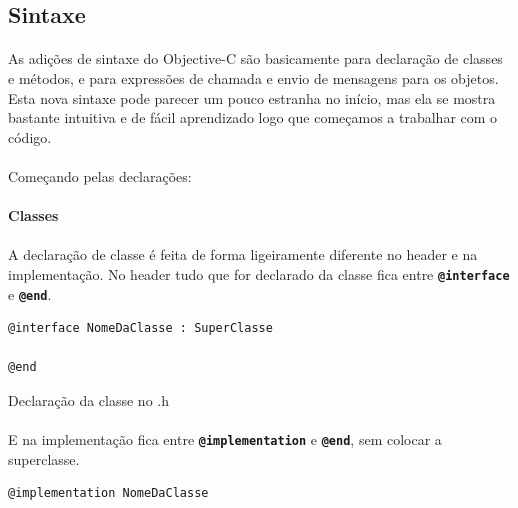 \documentclass[a4paper,12pt,brazil,doubleside]{book}
\begin{document}
\begin{singlespace}
\bigskip 

\subsection{Sintaxe}

\paragraph{}As adições de sintaxe do Objective-C são basicamente para declaração de classes e métodos, e para expressões de chamada e envio de mensagens para os objetos. Esta nova sintaxe pode parecer um pouco estranha no início, mas ela se mostra bastante intuitiva e de fácil aprendizado logo que começamos a trabalhar com o código.
\paragraph{}Começando pelas declarações:

\bigskip 

\paragraph{}\textbf{Classes}

\paragraph{}A declaração de classe é feita de forma ligeiramente diferente no header e na implementação. No header tudo que for declarado da classe fica entre \texttt{\textbf{@interface}} e \texttt{\textbf{@end}}.

\begin{listing}
\begin{verbatim}
@interface NomeDaClasse : SuperClasse

@end
\end{verbatim}
\caption{Declaração da classe no .h}
\end{listing}

\paragraph{}E na implementação fica entre \texttt{\textbf{@implementation}} e \texttt{\textbf{@end}}, sem colocar a superclasse.

\begin{listing}
\begin{verbatim}
@implementation NomeDaClasse


\end{verbatim}
\end{listing}
\end{singlespace}
\end{document}
